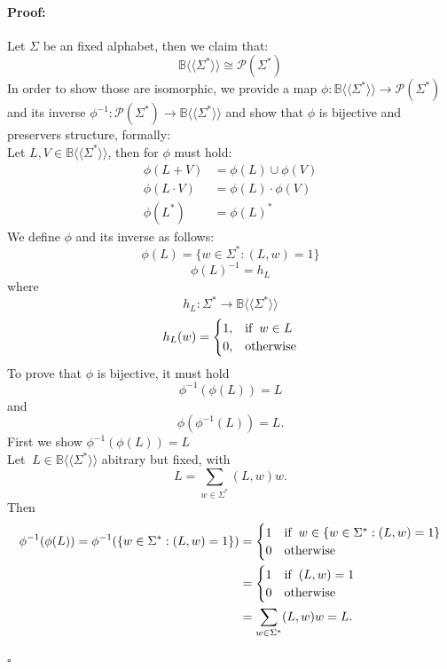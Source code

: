 \documentclass[12pt,letterpaper]{article}
\newenvironment{proof}{\paragraph{Proof:}}{\hfill$\square$}
\newcommand{\fps}[1] {
\mathbb{#1}\langle \langle \Sigma^* \rangle \rangle
}
\begin{document}
\begin{proof}
  Let $\Sigma$ be an fixed alphabet, then we claim that:
  \[
    \mathbb{B}\langle \langle \Sigma^* \rangle \rangle
    \cong \mathcal{P}(\Sigma^*)\]
  In order to show those are isomorphic, we provide a map $\phi: 
  \mathbb{B}\langle \langle \Sigma^* \rangle \rangle \to \mathcal{P}(\Sigma^*)$ 
  and its inverse $\phi^{-1}: \mathcal{P}(\Sigma^*) \to \fps{B}$ and
  show that $\phi$ is bijective and preservers structure, formally:\\
  Let $L,V \in \fps{B}$, then for $\phi$ must hold:
  \begin{align}
    \phi(L + V) &= \phi(L) \cup \phi(V) \\
    \phi(L \cdot V) &= \phi(L) \cdot \phi(V)\\
    \phi(L^*) &= \phi(L)^*
  \end{align}
  We define $\phi$ and its inverse as follows:
  \[ 
    \phi(L) = \{ w \in \Sigma^* : (L,w) = 1\}
  \]
  \[
    \phi(L)^{-1} = h_{L}
  \]
  where
  \[ h_L: \Sigma^* \to \fps{B}\]
  \[
    h_L(w) = 
    \begin{cases}
      1, & \text{if} \hspace{0.2cm} w \in L \\
      0, & \text{otherwise}
    \end{cases}
  \]
  To prove that $\phi$ is bijective, it must hold
    \[ 
      \phi^{-1}(\phi(L)) = L
    \]
    and 
    \[
      \phi(\phi^{-1}(L)) = L.
    \]
    First we show $\phi^{-1}(\phi(L)) = L$\\
    Let $\ L \in \fps{B}$ abitrary but fixed, with 
    \[ L =\sum_{w \in \Sigma^*} (L,w)w. \]
    Then
    \begin{align*}
      \phi^{-1}(\phi(L)) = \phi^{-1}(\{ w \in \Sigma^* : (L,w) =1 \})
       &= 
       \begin{cases}
        1 & \text{if} \hspace{0.2cm} w \in \{ w \in \Sigma^* : (L,w) =1 \}\\
        0 & \text{otherwise}
       \end{cases}\\
       &= 
       \begin{cases}
        1 & \text{if} \hspace{0.2cm} (L,w) = 1\\
        0 & \text{otherwise}
       \end{cases}\\
       &= 
       \sum_{w \in \Sigma^*} (L,w)w = L.
    \end{align*}

\end{proof}
\end{document}
